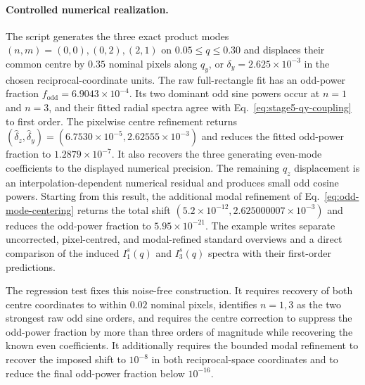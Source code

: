\documentclass[aps,prb,preprint,onecolumn,notitlepage,amsmath,amssymb,
  superscriptaddress,floatfix]{revtex4-2}
\begin{document}
\paragraph{Controlled numerical realization.}
The script  generates the
three exact product modes $(n,m)=(0,0),(0,2),(2,1)$ on
$0.05\leq q\leq0.30$ and displaces their common centre by $0.35$ nominal
pixels along $q_y$, or
$\delta_y=2.625\times10^{-3}$ in the chosen reciprocal-coordinate units.
The raw full-rectangle fit has an odd-power fraction
$f_{\mathrm{odd}}=6.9043\times10^{-4}$.  Its two dominant odd sine powers
occur at $n=1$ and $n=3$, and their fitted radial spectra agree with
Eq.~\eqref{eq:stage5-qy-coupling} to first order.  The pixelwise centre refinement
returns
$(\widehat\delta_z,\widehat\delta_y)
=(6.7530\times10^{-5},2.62555\times10^{-3})$ and reduces the fitted odd-power
fraction to $1.2879\times10^{-7}$.  It also recovers the three generating
even-mode coefficients to the displayed numerical precision.  The remaining
$q_z$ displacement is an interpolation-dependent numerical residual and
produces small odd cosine powers. Starting from this result, the additional
modal refinement of Eq.~\eqref{eq:odd-mode-centering} returns the total shift
$(5.2\times10^{-12},2.625000007\times10^{-3})$ and reduces the odd-power
fraction to $5.95\times10^{-21}$. The example writes separate uncorrected,
pixel-centred, and modal-refined standard overviews and a direct comparison of
the induced $I_1^s(q)$ and $I_3^s(q)$ spectra with their first-order
predictions.

The regression test  fixes this
noise-free construction.  It requires recovery of both centre coordinates to
within $0.02$ nominal pixels, identifies $n=1,3$ as the two strongest raw odd
sine orders, and requires the centre correction to suppress the odd-power
fraction by more than three orders of magnitude while recovering the known
even coefficients. It additionally requires the bounded modal refinement to
recover the imposed shift to $10^{-8}$ in both reciprocal-space coordinates
and to reduce the final odd-power fraction below $10^{-16}$.
\end{document}
